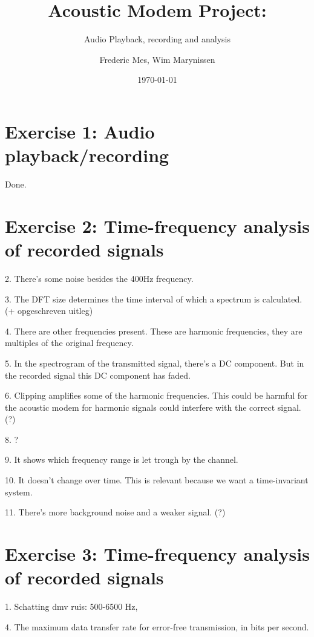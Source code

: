 \documentclass[a4paper,11pt]{article}
\title{ Acoustic Modem Project:}
\subtitle{Audio Playback, recording and analysis}
\author{Frederic Mes, Wim Marynissen}
\date{\today}
\begin{document}
\maketitle

\section{Exercise 1: Audio playback/recording}
Done.


\section{Exercise 2: Time-frequency analysis of recorded signals}

2.	There's some noise besides the 400Hz frequency.

3.	The DFT size determines the time interval of which a spectrum is calculated.
	(+ opgeschreven uitleg)
	
4.	There are other frequencies present. These are harmonic frequencies, they are
multiples of the original frequency.

5.	In the spectrogram of the transmitted signal, there's a DC component. But in
the recorded signal this DC component has faded. 

6.	Clipping amplifies some of the harmonic frequencies. This could be harmful
for the acoustic modem for harmonic signals could interfere with the correct
signal. (?)

8.	?

9. It shows which frequency range is let trough by the channel.

10. It doesn't change over time. This is relevant because we want a
time-invariant system.

11. There's more background noise and a weaker signal. (?)

\section{Exercise 3: Time-frequency analysis of recorded signals}

1. Schatting dmv ruis: 500-6500 Hz,

4. The maximum data transfer rate for error-free transmission, in bits per
second.
\end{document}
